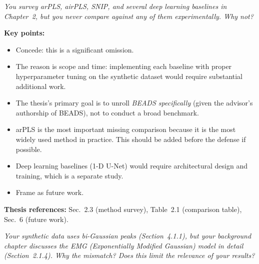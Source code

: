 \documentclass[11pt, letterpaper]{article}
\newcounter{qcounter}
\newcommand{\question}[1]{%
  \stepcounter{qcounter}%
  \begin{questionbox}[Q\theqcounter]%
    \itshape #1%
  \end{questionbox}%
}
\begin{document}
\question{You survey arPLS, airPLS, SNIP, and several deep learning
baselines in Chapter~2, but you never compare against \emph{any}
of them experimentally.  Why not?}

\begin{answerbox}
\textbf{Key points:}
\begin{itemize}[nosep]
  \item Concede: this is a significant omission.
  \item The reason is scope and time: implementing each baseline
        with proper hyperparameter tuning on the synthetic dataset
        would require substantial additional work.
  \item The thesis's primary goal is to unroll \emph{BEADS
        specifically} (given the advisor's authorship of BEADS),
        not to conduct a broad benchmark.
  \item arPLS is the most important missing comparison because it is
        the most widely used method in practice.  This should be
        added before the defense if possible.
  \item Deep learning baselines (1-D U-Net) would require
        architectural design and training, which is a separate study.
  \item Frame as future work.
\end{itemize}
\textbf{Thesis references:} Sec.~2.3 (method survey), Table~2.1 (comparison table), Sec.~6 (future work).
\end{answerbox}

\question{Your synthetic data uses bi-Gaussian peaks (Section~4.1.1), but
your background chapter discusses the EMG (Exponentially Modified
Gaussian) model in detail (Section~2.1.4).  Why the mismatch?  Does
this limit the relevance of your results?}
\end{document}
